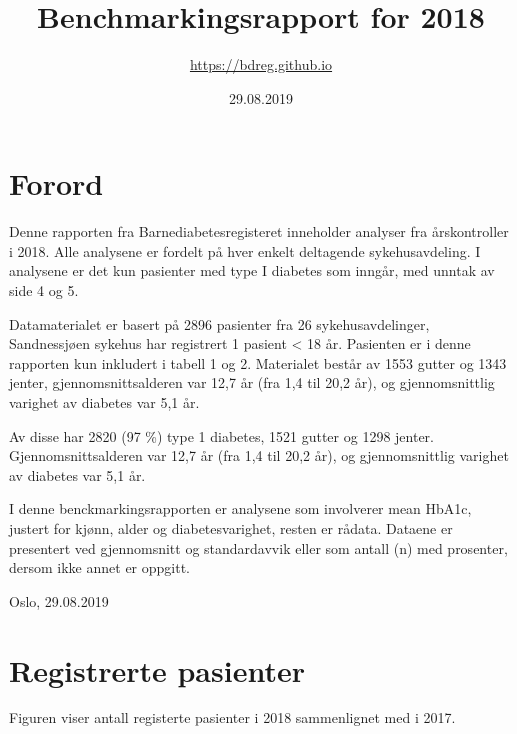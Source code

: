 \documentclass[]{article}
\title{Benchmarkingsrapport for 2018}
\author{\url{https://bdreg.github.io}}
\date{29.08.2019}
\begin{document}
\maketitle

\newpage

{
\setcounter{tocdepth}{2}
\tableofcontents
}
\newpage

\hypertarget{forord}{%
\section{Forord}\label{forord}}

Denne rapporten fra Barnediabetesregisteret inneholder analyser fra
årskontroller i 2018. Alle analysene er fordelt på hver enkelt
deltagende sykehusavdeling. I analysene er det kun pasienter med type I
diabetes som inngår, med unntak av side 4 og 5.

Datamaterialet er basert på 2896 pasienter fra 26 sykehusavdelinger,
Sandnessjøen sykehus har registrert 1 pasient \textless{} 18 år.
Pasienten er i denne rapporten kun inkludert i tabell 1 og 2. Materialet
består av 1553 gutter og 1343 jenter, gjennomsnittsalderen var 12,7 år
(fra 1,4 til 20,2 år), og gjennomsnittlig varighet av diabetes var 5,1
år.

Av disse har 2820 (97 \%) type 1 diabetes, 1521 gutter og 1298 jenter.
Gjennomsnittsalderen var 12,7 år (fra 1,4 til 20,2 år), og
gjennomsnittlig varighet av diabetes var 5,1 år.

I denne benckmarkingsrapporten er analysene som involverer mean HbA1c,
justert for kjønn, alder og diabetesvarighet, resten er rådata. Dataene
er presentert ved gjennomsnitt og standardavvik eller som antall (n) med
prosenter, dersom ikke annet er oppgitt.

\hfill \break

Oslo, 29.08.2019

\newpage

\hypertarget{registrerte-pasienter}{%
\section{Registrerte pasienter}\label{registrerte-pasienter}}

Figuren viser antall registerte pasienter i 2018 sammenlignet med i
2017.
\end{document}
